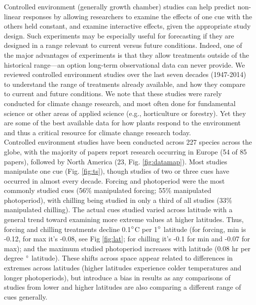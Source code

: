 \documentclass[11pt,letter]{article}
\begin{document}
Controlled environment (generally growth chamber) studies can help predict non-linear responses by allowing researchers to examine the effects of one cue with the others held constant, and examine interactive effects, given the appropriate study design. Such experiments may be especially useful for forecasting if they are designed in a range relevant to current versus future conditions. Indeed, one of the major advantages of experiments is that they allow treatments outside of the historical range---an option long-term observational data can never provide. We reviewed controlled environment studies over the last seven decades (1947-2014) to understand the range of treatments already available, and how they compare to current and future conditions. We note that these studies were rarely conducted for climate change research, and most often done for fundamental science or other areas of applied science (e.g., horticulture or forestry). Yet they are some of the best available data for how plants respond to the environment and thus a critical resource for climate change research today.\\

Controlled environment studies have been conducted across 227 species across the globe, with the majority of papers report research occurring in Europe (54 of 85 papers), followed by North America (23, Fig. \ref{fig:datamap}). Most studies manipulate one cue (Fig. \ref{fig:ts}), though studies of two or three cues have occurred in almost every decade. Forcing and photoperiod were the most commonly studied cues (56\% manipulated forcing; 55\% manipulated photoperiod), with chilling being studied in only a third of all studies (33\% manipulated chilling). The actual cues studied varied across latitude with a general trend toward examining more extreme values at higher latitudes. Thus, forcing and chilling treatments decline 0.1$\degree$C per 1$\degree$ latitude (for forcing, min is -0.12, for max it's -0.08, see Fig \ref{fig:lat}; for chilling it's -0.1 for min and -0.07 for max); and the maximum studied photoperiod increases with latitude (0.08 hr per degree $\degree$ latitude). These shifts across space appear related to differences in extremes across latitudes (higher latitudes experience colder temperatures and longer photoperiods), but introduce a bias in results as any comparisons of studies from lower and higher latitudes are also comparing a different range of cues generally. \\
\end{document}
